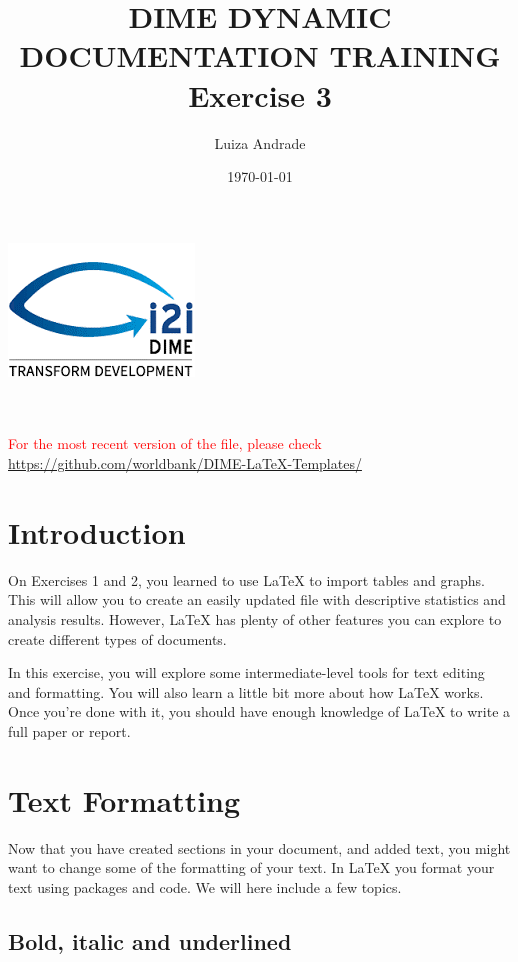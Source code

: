 \documentclass[12pts]{article}
\title{DIME DYNAMIC DOCUMENTATION TRAINING \\ Exercise 3}
\author{Luiza Andrade}
\date{\today}
\begin{document}
	
	
	\makeatletter
	\begin{titlepage}
		\begin{center}
			\includegraphics[width=0.3\linewidth]{../img/i2i.png}\\[10ex]
			{\LARGE \bfseries  \@title }\\[2ex] 
			{\Large  \@author}\\[20ex] 
			{\large \@date}
		\end{center}
	\textcolor{red}{For the most recent version of the file, please check \url{https://github.com/worldbank/DIME-LaTeX-Templates/}}
	\end{titlepage}
	\makeatother
	
	\tableofcontents
	
	\newpage			
	\section*{Introduction}
	
On Exercises 1 and 2, you learned to use {\LaTeX} to import tables and graphs. This will allow you to create an easily updated file with descriptive statistics and analysis results. However, {\LaTeX} has plenty of other features you can explore to create different types of documents. 

In this exercise, you will explore some intermediate-level tools for text editing and formatting. You will also learn a little bit more about how {\LaTeX} works. Once you're done with it, you should have enough knowledge of {\LaTeX} to write a full paper or report.
	
	
	\section{Text Formatting}
	
	Now that you have created sections in your document, and added text, you might want to change some of the formatting of your text. In {\LaTeX} you format your text using packages and code. We will here include a few topics.
	
	\subsection{Bold, italic and underlined}
	
\end{document}
